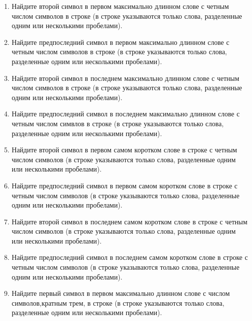 \begin{enumerate}
\item Найдите второй символ в первом максимально длинном слове с четным числом символов в строке (в строке указываются только слова, разделенные одним или несколькими пробелами). 
\item Найдите предпоследний символ в первом максимально длинном слове с четным числом символов в строке (в строке указываются только слова, разделенные одним или несколькими пробелами). 
\item Найдите второй символ в последнем максимально длинном слове с четным числом символов в строке (в строке указываются только слова, разделенные одним или несколькими пробелами). 
\item Найдите предпоследний символ в последнем максимально длинном слове с четным числом симвлов в строке (в строке указываются только слова, разделенные одним или несколькими пробелами). 
\item Найдите второй символ в первом самом коротком слове в строке с четным числом символов (в строке указываются только слова, разделенные одним или несколькими пробелами). 
\item Найдите предпоследний символ в первом самом коротком слове в строке с четным числом символов (в строке указываются только слова, разделенные одним или несколькими пробелами). 
\item Найдите второй символ в последнем самом коротком слове в строке с четным числом символов (в строке указываются только слова, разделенные одним или несколькими пробелами). 
\item Найдите предпоследний символ в последнем самом коротком слове в строке с четным числом символов (в строке указываются только слова, разделенные одним или несколькими пробелами). 

\item Найдите первый символ в первом максимально длинном слове с числом символов,кратным трем, в строке (в строке указываются только слова, разделенные одним или несколькими пробелами). 



\end{enumerate}

